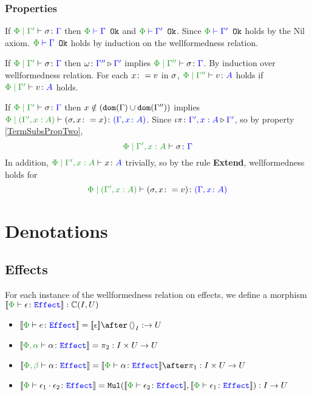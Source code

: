 \documentclass{report}
\begin{document}
    \subsection{Properties}
        \begin{property}[Wellformedness]\label{TermSubsPropOne}
            If $\etyperelation{\P}{\G'}{\si}{\G}$ then $\wellformedok{\P}{\G}$ and $\wellformedok{\P}{\G'}$. 
            Since $\wellformedok{\P}{\G'}$ holds by the Nil axiom. $\wellformedok{\P}{\G}$ holds by induction on the wellformedness relation.
        \end{property}

        \begin{property}[Weakening]\label{TermSubsPropTwo}
            If $\etyperelation{\P}{\G'}{\si}{\G}$ then $\omega \colon {\color{blue}\Gamma''} \triangleright {\color {blue} \Gamma'}$ implies $\etyperelation{\P}{\G''}{\si}{\G}$. 
            By induction over wellformedness relation. For each $x\colon= v$ in $\sigma$, $\etyperelation{\P}{\G''}{v}{A}$ holds if $\etyperelation{\P}{\G'}{v}{A}$ holds.
        \end{property}

        \begin{property}[Extension]\label{TermSubsPropThree}
            If $\etyperelation{\P}{\G'}{\si}{\G}$ then $x \notin (\texttt{dom}(\Gamma) \cup \texttt{dom}(\Gamma''))$ implies $\etyperelation{\P}{(\G', x: A)}{(\si, x \setto x)}{(\gax)}$. Since $\iota\pi \colon {\color{blue}\Gamma',x: A} \triangleright {\color {blue} \Gamma'}$, so by property \ref{TermSubsPropTwo}, 
            $$\etyperelation{\P}{\G', x: A}{\si}{\G}$$
            In addition, $\etyperelation{\P}{\G', x: A}{x}{A}$ trivially, so by the rule \textbf{Extend}, wellformedness holds for
            \begin{equation}
                \etyperelation{\P}{(\G', x:A)}{(\si, x\setto v)}{(\gax)}
            \end{equation}
        \end{property}


\chapter{Denotations}
\section{Effects}
For each instance of the wellformedness relation on effects, we define a morphism $\deno{\typerelation{\P}{\e}{\effect}}: \ciu$

\begin{itemize}
    \item $\deno{\typerelation{\P}{e}{\effect}} = \deno{\e} \after \term{I}: \rightarrow U$
    \item $\deno{\typerelation{\P,\a}{\a}{\effect}} = \pp: I\times U \rightarrow U$
    
    \item $\deno{\typerelation{\P, \b}{\a}{\effect}} = \deno{\typerelation{\P}{\a}{\effect}}\after\p: I\times U\rightarrow U$
    
    \item $\deno{\typerelation{\P}{\e_1\dot \e_2}{\effect}} = \Mul(\deno{\typerelation{\P}{\e_2}{\effect}},\deno{\typerelation{\P}{\e_1}{\effect}}): I \rightarrow U$
\end{itemize}
\end{document}
